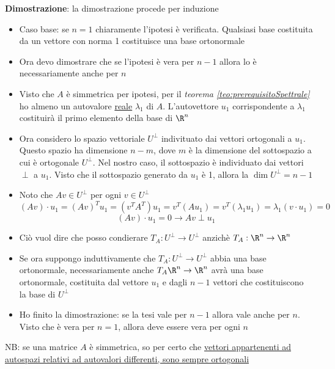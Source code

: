 \documentclass[12pt,a4paper,oneside]{article}
\begin{document}
\textbf{Dimostrazione}: la dimostrazione procede per induzione
\begin{itemize}
	\item Caso base: se $ n = 1 $ chiaramente l'ipotesi è verificata. Qualsiasi base costituita da un vettore con norma 1 costituisce una base ortonormale
	\item Ora devo dimostrare che se l'ipotesi è vera per $ n-1 $ allora lo è necessariamente anche per $ n $
	\item Visto che $ A $ è simmetrica per ipotesi, per il \textit{teorema \ref{teo:prerequisitoSpettrale}} ho almeno un autovalore \underline{reale} $ \lambda_1 $ di $ A $. L'autovettore $ u_1 $ corrispondente a $ \lambda_1 $ costituirà il primo elemento della base di $ \R^{n} $
	\item Ora considero lo spazio vettoriale $ U^{\perp} $ indivituato dai vettori ortogonali a $ u_1 $. Questo spazio ha dimensione $ n-m $, dove $ m $ è la dimensione del sottospazio a cui è ortogonale $ U^{\perp} $. Nel nostro caso, il sottospazio è individuato dai vettori $ \perp $ a $ u_1 $. Visto che il sottospazio generato da $ u_1 $ è 1, allora la  $ \dim U^{\perp} = n-1$
	\item Noto che $ Av \in U^{\perp} $ per ogni $ v \in U^{\perp} $
	      \[
		      (A v) \cdot u_1=(A v)^T u_1=\left(v^T A^T\right) u_1=v^T\left(A u_1\right)=v^T\left(\lambda_1 u_1\right)=\lambda_1\left(v \cdot u_1\right)=0
	      \]
	      \[
		      \left( Av \right) \cdot u_1 = 0 \rightarrow Av \perp u_1
	      \]
	\item Ciò vuol dire che posso condierare $T_A : U^{\perp} \to U^{\perp} $ anzichè $ T_A : \R^{n} \to \R^{n} $
	\item Se ora suppongo induttivamente che $T_A : U^{\perp} \to U^{\perp} $ abbia una base ortonormale, necessariamente anche $ T_A \R^{n} \to \R^{n} $ avrà una base ortonormale, costituita dal vettore $ u_1 $ e dagli $ n-1 $ vettori che costituiscono la base di $ U^{\perp} $
	\item Ho finito la dimostrazione: se la tesi vale per $ n-1 $ allora vale anche per $ n $. Visto che è vera per $ n=1 $, allora deve essere vera per ogni $ n $
\end{itemize}
NB: se una matrice $ A $ è simmetrica, so per certo che \underline{vettori appartenenti ad autospazi relativi ad autovalori differenti, sono sempre ortogonali}
\end{document}
